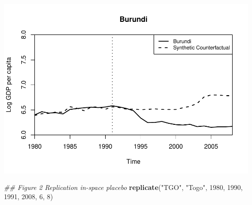 \documentclass[]{article}
\newenvironment{Shaded}{\begin{snugshade}}{\end{snugshade}}
\newcommand{\CommentTok}[1]{\textcolor[rgb]{0.56,0.35,0.01}{\textit{#1}}}
\newcommand{\DecValTok}[1]{\textcolor[rgb]{0.00,0.00,0.81}{#1}}
\newcommand{\KeywordTok}[1]{\textcolor[rgb]{0.13,0.29,0.53}{\textbf{#1}}}
\newcommand{\NormalTok}[1]{#1}
\newcommand{\StringTok}[1]{\textcolor[rgb]{0.31,0.60,0.02}{#1}}
\begin{document}
\includegraphics{ProjectNotebook_files/figure-latex/unnamed-chunk-9-1.pdf}

\begin{Shaded}
\begin{Highlighting}[]
\CommentTok{## Figure 2 Replication in-space placebo}
\KeywordTok{replicate}\NormalTok{(}\StringTok{"TGO"}\NormalTok{, }\StringTok{"Togo"}\NormalTok{, }\DecValTok{1980}\NormalTok{, }\DecValTok{1990}\NormalTok{, }\DecValTok{1991}\NormalTok{, }\DecValTok{2008}\NormalTok{, }\DecValTok{6}\NormalTok{, }\DecValTok{8}\NormalTok{)  }
\end{Highlighting}
\end{Shaded}
\end{document}
